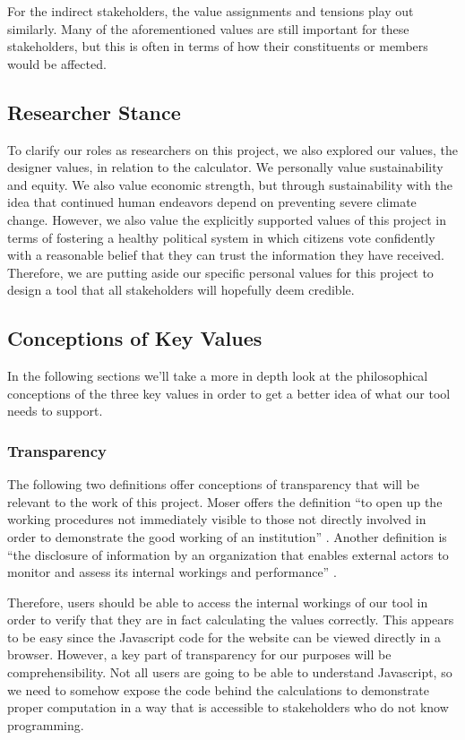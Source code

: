 \documentclass{sigchi}
\begin{document}
For the indirect stakeholders, the value assignments and tensions play out similarly. Many 
of the aforementioned values are still important for these stakeholders, but this is often in terms of 
how their constituents or members would be affected. 


\subsection{Researcher Stance}
To clarify our roles as researchers on this project, we also explored 
our values, the designer values, in relation to the calculator. We personally 
value sustainability and equity. We also value economic strength, but through 
sustainability with the idea that continued human endeavors depend on preventing 
severe climate change. However, we also value the explicitly supported values of this project 
in terms of fostering a healthy political system in which citizens vote confidently 
with a reasonable belief that they can trust the information they have received. Therefore, we 
are putting aside our specific personal values for this project to design a tool that 
all stakeholders will hopefully deem credible. 

\subsection{Conceptions of Key Values}
In the following sections we'll take a more in depth look at the philosophical conceptions 
of the three key values in order to get a better idea of what our tool needs to support. 

\subsubsection{Transparency}
The following two definitions offer conceptions of transparency that will be relevant to the 
work of this project. Moser offers the definition ``to open up the working procedures not immediately 
visible to those not directly involved in order to demonstrate the good working of an institution'' \cite{moser}. 
Another definition is ``the disclosure of information by an organization that enables external actors to 
monitor and assess its internal workings and performance'' \cite{compMediated}. 

Therefore, users should be able to access the internal workings of our tool in order to verify that they are in 
fact calculating the values correctly. This appears to be easy since the Javascript code for the website can be 
viewed directly in a browser. However, a key part of transparency for our purposes will be comprehensibility. Not 
all users are going to be able to understand Javascript, so we need to somehow expose the code behind the calculations 
to demonstrate proper computation in a way that is accessible to stakeholders who do not know programming.
\end{document}
